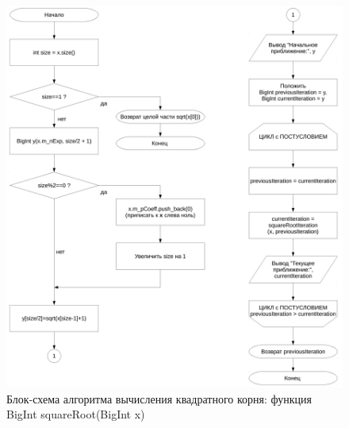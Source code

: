 \documentclass[a4paper,12pt]{article} %
\begin{document}
\begin{figure}[ht]
	\includegraphics[width=\textwidth]{lr6_squareRoot.pdf}
	\caption{Блок-схема алгоритма вычисления квадратного корня: функция BigInt squareRoot(BigInt x)}
	\label{bs_square_root}
\end{figure}
\end{document}
